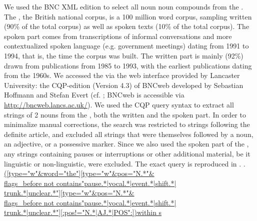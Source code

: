 We used the \nocite{BNCxml} BNC XML edition to select all noun noun compounds
from the . 
The , the British national corpus, is a 100 million
word corpus, sampling written (90\% of
the total corpus) as well as spoken texts (10\% of
the total corpus). The spoken part comes from transcriptions of
informal conversations and more contextualized spoken language (e.g.
government meetings) dating from 1991 to 1994, that is, the time the corpus was built. The written part is mainly (92\%) drawn from
publications from 1985 to 1993, with the earliest publications dating from the 1960s. We accessed the  via the web interface provided by
Lancaster University: the CQP-edition (Version 4.3) of BNCweb
developed by Sebastian Hoffmann and Stefan Evert
(cf. \citealt{Hoffmannetal:2008}; BNCweb is accessible via
\url{http://bncweb.lancs.ac.uk/}). We used the CQP
query syntax to extract all strings of 2 nouns from the , both
the written and the spoken part. In order to minimalize manual
corrections, the search was restricted to strings following the definite
article, and excluded all strings that were themselves followed by a
noun, an adjective, or a possessive marker. Since we also used the
spoken part of the , any strings containing pauses or interruptions or other additional
material, be it linguistic or non-linguistic, were excluded. The exact query is
reproduced in \Next.
\ex. 
 \url{([type="w"&word="the"][type="w"&pos="N.*"&}\\\url{flags_before not contains"pause.*|vocal.*|event.*|shift.*|}\\\url{trunk.*|unclear.*"][type="w"&pos="N.*"&}\\\url{flags_before not contains"pause.*|vocal.*|event.*|shift.*|}\\\url{trunk.*|unclear.*"][:pos!="N.*|AJ.*|POS":])within s}


